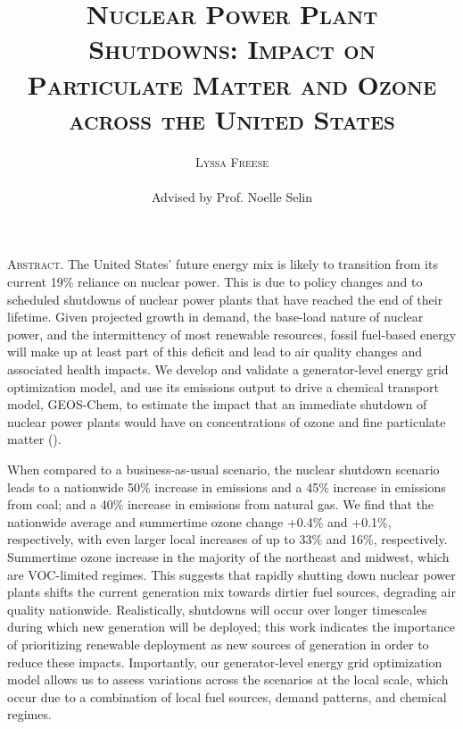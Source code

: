 \documentclass[12]{article}
\title{{\textsc{\Large Nuclear Power Plant Shutdowns: Impact on Particulate Matter and Ozone across the United States}}}
\author{\textsc{Lyssa Freese}
\\\\
Advised by Prof. Noelle Selin}
\begin{document}
\maketitle
\thispagestyle{empty}

\setlength{\leftskip}{1.1cm}
\setlength{\rightskip}{1.1cm}


\bigskip
\bigskip

{\textsc{Abstract.} 
The United States’ future energy mix is likely to transition from its current 19\% reliance on nuclear power. This is due to policy changes and to scheduled shutdowns of nuclear power plants that have reached the end of their lifetime. Given projected growth in demand, the base-load nature of nuclear power, and the intermittency of most renewable resources, fossil fuel-based energy will make up at least part of this deficit and lead to air quality changes and associated health impacts. We develop and validate a generator-level energy grid optimization model, and use its emissions output to drive a chemical transport model, GEOS-Chem, to estimate the impact that an immediate shutdown of nuclear power plants would have on concentrations of ozone and fine particulate matter ().

When compared to a business-as-usual scenario, the nuclear shutdown scenario leads to a nationwide 50\% increase in  emissions and a 45\% increase in  emissions from coal; and a 40\% increase in  emissions from natural gas. We find that the nationwide average  and summertime ozone change +0.4\% and +0.1\%, respectively, with even larger local increases of up to 33\% and 16\%, respectively. Summertime ozone increase in the majority of the northeast and midwest, which are VOC-limited regimes. This suggests that rapidly shutting down nuclear power plants shifts the current generation mix towards dirtier fuel sources, degrading air quality nationwide. Realistically, shutdowns will occur over longer timescales during which new generation will be deployed; this work indicates the importance of prioritizing renewable deployment as new sources of generation in order to reduce these impacts. Importantly, our generator-level energy grid optimization model allows us to assess variations across the scenarios at the local scale, which occur due to a combination of local fuel sources, demand patterns, and chemical regimes.}

\bigskip
\bigskip 
\clearpage
\setcounter{page}{1}

\setlength{\leftskip}{0cm}
\setlength{\rightskip}{0cm}
\end{document}
